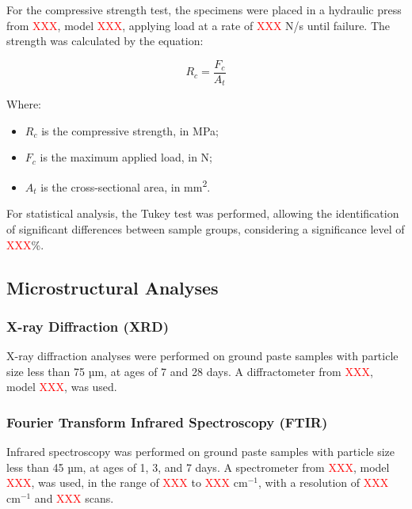 For the compressive strength test, the specimens were placed in a hydraulic press from \textcolor{red}{XXX}, model \textcolor{red}{XXX}, applying load at a rate of \textcolor{red}{XXX} N/s until failure. The strength was calculated by the equation:

\begin{equation}
    \label{eq:compressive_strength}
    R_c = \frac{F_c}{A_t}
\end{equation}

Where:
\begin{itemize}
    \item $R_c$ is the compressive strength, in MPa;
    \item $F_c$ is the maximum applied load, in N;
    \item $A_t$ is the cross-sectional area, in mm\textsuperscript{2}.
\end{itemize}

For statistical analysis, the Tukey test was performed, allowing the identification of significant differences between sample groups, considering a significance level of \textcolor{red}{XXX}\%.

\subsection{Microstructural Analyses}
\label{subsec:microstructural_analyses}

\subsubsection{X-ray Diffraction (XRD)}
\label{subsubsec:xrd}

X-ray diffraction analyses were performed on ground paste samples with particle size less than 75 µm, at ages of 7 and 28 days. A diffractometer from \textcolor{red}{XXX}, model \textcolor{red}{XXX}, was used.

\subsubsection{Fourier Transform Infrared Spectroscopy (FTIR)}
\label{subsubsec:ftir}

Infrared spectroscopy was performed on ground paste samples with particle size less than 45 µm, at ages of 1, 3, and 7 days. A spectrometer from \textcolor{red}{XXX}, model \textcolor{red}{XXX}, was used, in the range of \textcolor{red}{XXX} to \textcolor{red}{XXX} cm$^{-1}$, with a resolution of \textcolor{red}{XXX} cm$^{-1}$ and \textcolor{red}{XXX} scans.

